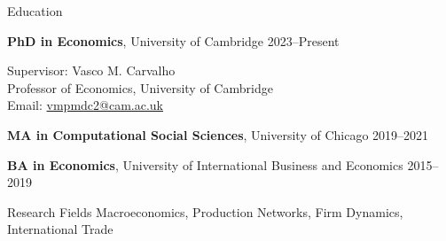 \documentclass{resume}
\begin{document}

\begin{rSection}{Education}

\textbf{PhD in Economics}, University of Cambridge \hfill 2023–Present
\begin{rItemize}
    \item Supervisor: Vasco M. Carvalho \\ 
    Professor of Economics, University of Cambridge \\ 
    Email: \href{mailto:vmpmdc2@cam.ac.uk}{vmpmdc2@cam.ac.uk}
\end{rItemize}
\textbf{MA in Computational Social Sciences}, University of Chicago \hfill 2019–2021

\textbf{BA in Economics}, University of International Business and Economics \hfill 2015–2019

\end{rSection}

\begin{rSection}{Research Fields}
Macroeconomics, Production Networks, Firm Dynamics, International Trade
\end{rSection}
\end{document}
